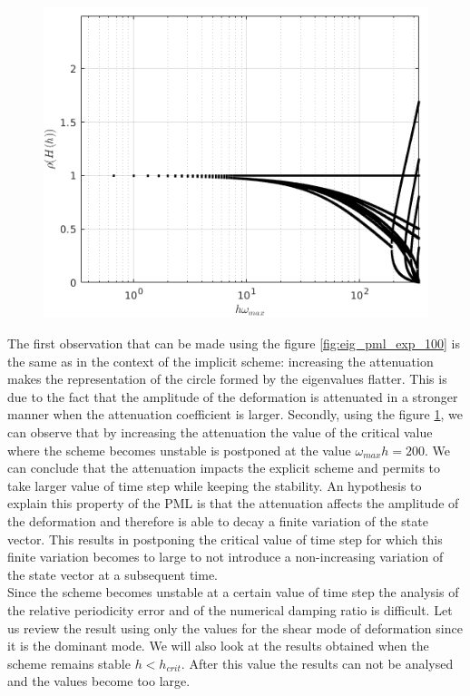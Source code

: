 \begin{itemize}
\begin{figure}[H]
\begin{minipage}{.5\textwidth}
  \includegraphics[width=.99\linewidth]{images/spect_rad_pml_exp_100.png}
  \label{fig:spect_rad_pml_exp_100}
\end{minipage}
\end{figure} 
The first observation that can be made using the figure \ref{fig:eig_pml_exp_100} is the same as in the context of the implicit scheme: increasing the attenuation makes the representation of the circle formed by the eigenvalues flatter. This is due to the fact that the amplitude of the deformation is attenuated in a stronger manner when the attenuation coefficient is larger. Secondly, using the figure \ref{fig:spect_rad_pml_exp_100}, we can observe that by increasing the attenuation the value of the critical value where the scheme becomes unstable is postponed at the value $\omega_{max} h = 200$. We can conclude that the attenuation impacts the explicit scheme and permits to take larger value of time step while keeping the stability. An hypothesis to explain this property of the PML is that the attenuation affects the amplitude of the deformation and therefore is able to decay a finite variation of the state vector. This results in postponing the critical value of time step for which this finite variation becomes to large to not introduce a non-increasing variation of the state vector at a subsequent time. \\
Since the scheme becomes unstable at a certain value of time step the analysis of the relative periodicity error and of the numerical damping ratio is difficult. Let us review the result using only the values for the shear mode of deformation since it is the dominant mode. We will also look at the results obtained when the scheme remains stable $h < h_{crit}$. After this value the results can not be analysed and the values become too large.  

\end{itemize}
